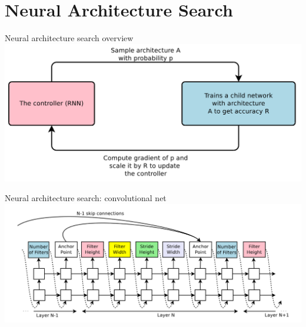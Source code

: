 \documentclass{beamer}
\begin{document}



\section{Neural Architecture Search}

{%
\begin{frame}{Neural architecture search overview}
        \center{}
        \includegraphics[scale=0.275]{data/zoph-arch-search-overview}
\end{frame}
}

{%
\begin{frame}{Neural architecture search: convolutional net}
        \center{}
        \vspace{-1.5cm}
        \hspace*{-1.25cm}
        \includegraphics[scale=0.3]{data/neural_arch_convnet}
\end{frame}
}
\end{document}
